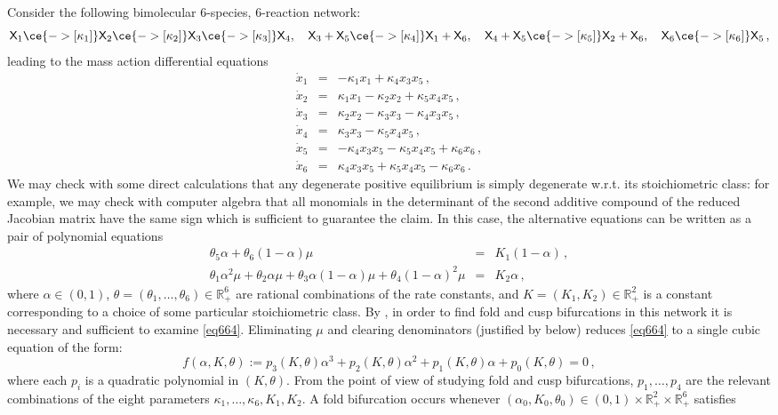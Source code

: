 \documentclass[11pt]{amsart}
\renewcommand{\k}{\kappa}
\renewcommand{\t}{\theta}
\newcommand{\R}{\mathbb{R}}
\newcommand{\fX}{\mathsf{X}}
\theoremstyle{definition}
\newenvironment{ex}
  {\pushQED{\qed}\renewcommand{\qedsymbol}{$\Diamond$}\example}
  {\popQED\endexample}
\begin{document}
\begin{ex}
\label{ex664}
Consider the following bimolecular 6-species, 6-reaction network:
\[
\fX_1 \ce{->[\k_1]} \fX_2 \ce{->[\k_2]} \fX_3 \ce{->[\k_3]} \fX_4, \quad \fX_3+\fX_5 \ce{->[\k_4]} \fX_1 + \fX_6, \quad \fX_4+\fX_5 \ce{->[\k_5]} \fX_2 + \fX_6, \quad \fX_6 \ce{->[\k_6]} \fX_5\,,
\]
leading to the mass action differential equations
\[
\begin{array}{rcl}
\dot x_1 &=& -\k_1 x_1 + \k_4x_3x_5\,,\\
\dot x_2 &=& \k_1x_1-\k_2x_2+\k_5x_4x_5\,,\\
\dot x_3 &=& \k_2x_2 - \k_3x_3 - \k_4x_3x_5\,,\\
\dot x_4 &=& \k_3x_3 - \k_5x_4x_5\,,\\
\dot x_5 &=& -\k_4x_3x_5-\k_5x_4x_5+\k_6x_6\,,\\
\dot x_6 &=& \k_4x_3x_5 + \k_5x_4x_5 - \k_6x_6\,.
\end{array}
\]
We may check with some direct calculations that any degenerate positive equilibrium is simply degenerate w.r.t. its stoichiometric class: for example, we may check with computer algebra that all monomials in the determinant of the second additive compound \cite{muldowney} of the reduced Jacobian matrix \cite{banajipantea} have the same sign which is sufficient to guarantee the claim. In this case, the alternative equations can be written as a pair of polynomial equations
\begin{equation}
\label{eq664}
\begin{array}{rcl}
 \t_5\alpha + \t_6(1-\alpha)\mu & = & K_1(1-\alpha)\,,\\[5pt]
 \t_1\alpha^2\mu + \t_2\alpha\mu + \t_3\alpha(1-\alpha)\mu + \t_4(1-\alpha)^2\mu & = & K_2\alpha\,,
\end{array}
\end{equation}
where $\alpha \in (0,1)$, $\t = (\t_1, \ldots, \t_6) \in \R^6_+$ are rational combinations of the rate constants, and $K=(K_1,K_2) \in \R^2_+$ is a constant corresponding to a choice of some particular stoichiometric class. By , in order to find fold and cusp bifurcations in this network it is necessary and sufficient to examine \eqref{eq664}. Eliminating $\mu$ and clearing denominators (justified by  below) reduces \eqref{eq664} to a single cubic equation of the form:
\[
f(\alpha, K,\t):=p_3(K,\t)\alpha^3 + p_2(K,\t)\alpha^2+p_1(K,\t)\alpha + p_0(K,\t) = 0\,,
\]
where each $p_i$ is a quadratic polynomial in $(K,\t)$. From the point of view of studying fold and cusp bifurcations, $p_1, \ldots, p_4$ are the relevant combinations of the eight parameters $\k_1, \ldots, \k_6, K_1, K_2$. A fold bifurcation occurs whenever $(\alpha_0,K_0,\t_0) \in (0,1) \times \R^2_+ \times \R^6_+$ satisfies 

\end{ex}
\end{document}
